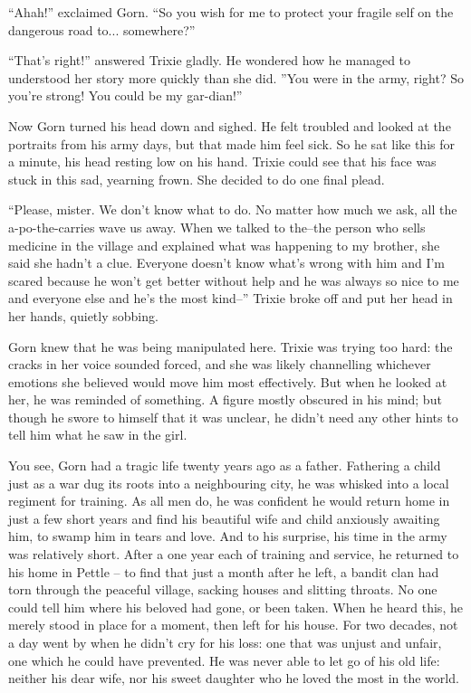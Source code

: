 ``Ahah!'' exclaimed Gorn. ``So you wish for me to protect your fragile self on
the dangerous road to... somewhere?''

``That's right!'' answered Trixie gladly. He wondered how he managed to
understood her story more quickly than she did. ''You were in the army, right?
So you're strong! You could be my gar-dian!''

Now Gorn turned his head down and sighed. He felt troubled and looked at the
portraits from his army days, but that made him feel sick. So he sat like this
for a minute, his head resting low on his hand. Trixie could see that his face
was stuck in this sad, yearning frown. She decided to do one final plead.

``Please, mister. We don't know what to do. No matter how much we ask, all the
a-po-the-carries wave us away. When we talked to the--the person who sells
medicine in the village and explained what was happening to my brother, she said
she hadn't a clue. Everyone doesn't know what's wrong with him and I'm scared
because he won't get better without help and he was always so nice to me and
everyone else and he's the most kind--'' Trixie broke off and put her head in
her hands, quietly sobbing.

Gorn knew that he was being manipulated here. Trixie was trying too hard: the
cracks in her voice sounded forced, and she was likely channelling whichever
emotions she believed would move him most effectively. But when he looked at
her, he was reminded of something. A figure mostly obscured in his mind; but
though he swore to himself that it was unclear, he didn't need any other hints
to tell him what he saw in the girl.

You see, Gorn had a tragic life twenty years ago as a father. Fathering a child
just as a war dug its roots into a neighbouring city, he was whisked into a
local regiment for training. As all men do, he was confident he would return
home in just a few short years and find his beautiful wife and child anxiously
awaiting him, to swamp him in tears and love. And to his surprise, his time in
the army was relatively short. After a one year each of training and service, he
returned to his home in Pettle -- to find that just a month after he left, a
bandit clan had torn through the peaceful village, sacking houses and slitting
throats. No one could tell him where his beloved had gone, or been taken. When
he heard this, he merely stood in place for a moment, then left for his house.
For two decades, not a day went by when he didn't cry for his loss: one that was
unjust and unfair, one which he could have prevented. He was never able to let
go of his old life: neither his dear wife, nor his sweet daughter who he loved
the most in the world.

